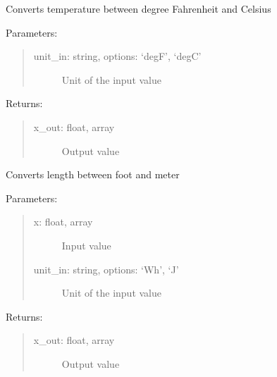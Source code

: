 \documentclass[letterpaper,10pt,english,openany]{sphinxmanual}
\begin{document}
\begin{fulllineitems}
\begin{fulllineitems}
\label{\detokenize{source/mswh.tools:mswh.tools.unit_converters.UnitConv.degF_degC}}
Converts temperature between degree Fahrenheit and Celsius

Parameters:
\begin{quote}
\begin{description}
\item[{unit\_in: string, options: ‘degF’, ‘degC’}] \leavevmode
Unit of the input value

\end{description}
\end{quote}

Returns:
\begin{quote}
\begin{description}
\item[{x\_out: float, array}] \leavevmode
Output value

\end{description}
\end{quote}

\end{fulllineitems}


\begin{fulllineitems}
\label{\detokenize{source/mswh.tools:mswh.tools.unit_converters.UnitConv.ft_m}}
Converts length between foot
and meter

Parameters:
\begin{quote}
\begin{description}
\item[{x: float, array}] \leavevmode
Input value

\item[{unit\_in: string, options: ‘Wh’, ‘J’}] \leavevmode
Unit of the input value

\end{description}
\end{quote}

Returns:
\begin{quote}
\begin{description}
\item[{x\_out: float, array}] \leavevmode
Output value


\end{description}
\end{quote}
\end{fulllineitems}
\end{fulllineitems}
\end{document}
